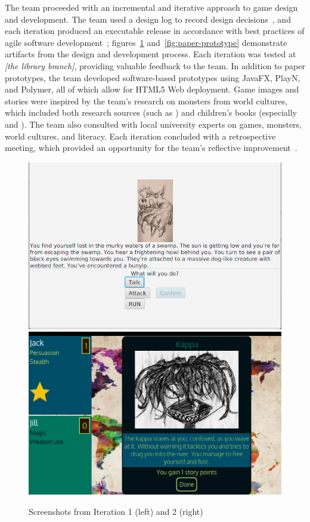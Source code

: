 \documentclass[a4paper]{article}
\begin{document}
The team proceeded with an incremental and
iterative approach to game design and development.
The team used a design log to record design decisions~\citep{Cook2011},
and each iteration
produced an executable release in accordance with best practices of
agile software development~\citep{Cockburn2006};
figures~\ref{fig:screenshots} and~\ref{fig:paper-prototype} demonstrate
artifacts from the design and development process.
Each iteration was tested at
\textit{[the library branch]}, providing valuable feedback to the
team. 
In addition to paper prototypes, the team 
developed software-based prototypes using JavaFX, PlayN, and Polymer, 
all of which allow for HTML5 Web deployment.
Game images and stories were inspired by the team's research on monsters
from world cultures, which included both research sources
(such as \citet{Cohen1996}) and children's books (especially
\citet{Steer2008} and \citet{Stowell2013}).
The team also consulted with local university experts on
games, monsters, world cultures, and literacy.
Each iteration concluded with a retrospective
meeting, which provided an opportunity for the
team's reflective improvement~\citep{Kerth2001,Schon1984}.

\begin{figure}
\centering
\includegraphics[width=\figwidth]{iteration-1}
\includegraphics[width=\figwidth]{kappa-encounter}
\caption{Screenshots from Iteration 1 (left) and 2 (right)}
\label{fig:screenshots}
\end{figure}
\end{document}
